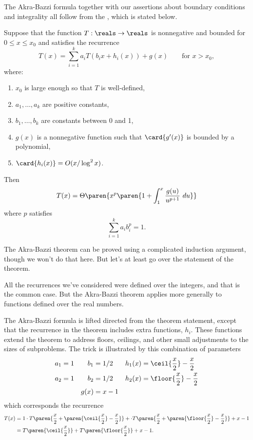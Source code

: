 The Akra-Bazzi formula together with our assertions about boundary
conditions and integrality all follow from the
, which is stated below.

\begin{theorem}
\label{th:akra-bazzi}
Suppose that the function $T: \reals \to \reals$ is nonnegative and
bounded for $0 \leq x \leq x_0$ and satisfies the recurrence
\begin{equation}\label{A-B_recurrence}
T(x) = \sum\limits_{i=1}^k a_i T(b_i x + h_i(x)) + g(x) \qquad \text{for $x > x_0$},
\end{equation}
where:
\begin{enumerate}
\item $x_0$ is large enough so that $T$ is well-defined,
\item $a_1, \dots, a_k$ are positive constants,
\item $b_1, \dots, b_k$ are constants between 0 and 1,
\item $g(x)$ is a nonnegative function such that $\card{g'(x)}$ is bounded
by a polynomial,
\item $\card{h_i(x)} = O(x / \log^2 x)$.
\end{enumerate}
Then
\[
T(x) = \Theta\paren{x^p \paren{1 + \int_1^x \frac{g(u)}{u^{p+1}}\ du}}
\]
where $p$ satisfies
\[
\sum_{i=1}^k {a_i b_i^p} = 1.
\]
\end{theorem}

The Akra-Bazzi theorem can be proved using a complicated induction
argument, though we won't do that here.  But let's at least go over
the statement of the theorem.

All the recurrences we've considered were defined over the integers, and
that is the common case.  But the Akra-Bazzi theorem applies more
generally to functions defined over the real numbers.

The Akra-Bazzi formula is lifted directed from the theorem statement,
except that the recurrence in the theorem includes extra functions,
$h_i$.  These functions extend the theorem to address floors,
ceilings, and other small adjustments to the sizes of subproblems.
The trick is illustrated by this combination of parameters
\begin{align*}
a_1 &= 1 & b_1 & = 1/2 & h_1(x) & =  \ceil{\frac{x}{2}} - \frac{x}{2}\\
a_2 &= 1 & b_2 & = 1/2 & h_2(x) & = \floor{\frac{x}{2}} - \frac{x}{2} \\
& & g(x) & = x - 1
\end{align*}
which corresponds the recurrence
\begin{align*}
T(x) & = 1 \cdot T\paren{\frac{x}{2} + \paren{ \ceil{\frac{x}{2}} -\frac{x}{2}}} + 
           \cdot T\paren{\frac{x}{2} + \paren{\floor{\frac{x}{2}} - \frac{x}{2}}} + x - 1 \\
 & = T\paren{\ceil{\frac{x}{2}}} +  T\paren{\floor{\frac{x}{2}}} + x - 1.
\end{align*}

